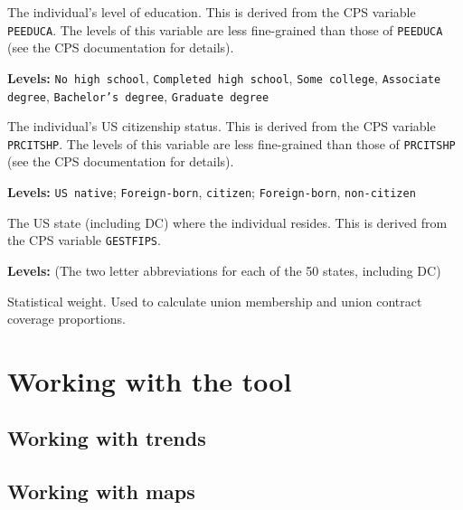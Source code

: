 \documentclass[letterpaper,12pt]{article}
\begin{document}
\begin{description}[style=multiline,leftmargin=3cm,font=\normalfont]
\item[\texttt{educ}] The individual's level of education. This is
  derived from the CPS variable \texttt{PEEDUCA}. The levels of this
  variable are less fine-grained than those of \texttt{PEEDUCA} (see
  the CPS documentation for details).

  \textbf{Levels:} \texttt{No high school}, \texttt{Completed high
    school}, \texttt{Some college}, \texttt{Associate degree},
  \texttt{Bachelor's degree}, \texttt{Graduate degree}

\item[\texttt{citizen}] The individual's US citizenship status. This
  is derived from the CPS variable \texttt{PRCITSHP}. The levels of
  this variable are less fine-grained than those of \texttt{PRCITSHP}
  (see the CPS documentation for details).

  \textbf{Levels:} \texttt{US native}; \texttt{Foreign-born},
  \texttt{citizen}; \texttt{Foreign-born}, \texttt{non-citizen}

\item[\texttt{state}] The US state (including DC) where the individual
  resides. This is derived from the CPS variable \texttt{GESTFIPS}.

  \textbf{Levels:} (The two letter abbreviations for each of the 50
  states, including DC)

\item[\texttt{weight}] Statistical weight. Used to calculate union
  membership and union contract coverage proportions.

\end{description}

\section{Working with the tool}

\subsection{Working with trends}

\subsection{Working with maps}
\end{document}
